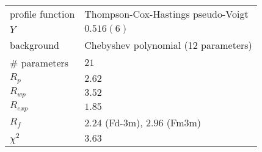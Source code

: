\documentclass[\main/dresen_thesis.tex]{subfiles}
\begin{document}
\begin{table}[ht]
\begin{tabular}{ l | l | l | l | l }
      \hline
      \multicolumn{2}{l}{profile function} & \multicolumn{3}{l}{Thompson-Cox-Hastings pseudo-Voigt}\\
      \multicolumn{2}{l}{$Y$} & \multicolumn{3}{l}{$0.516(6)$}\\
      \hline
      \multicolumn{2}{l}{background} & \multicolumn{3}{l}{Chebyshev polynomial (12 parameters)} \\
      \hline
      \multicolumn{2}{l}{\# parameters} & \multicolumn{3}{l}{$21$}\\
      \multicolumn{2}{l}{$R_p$} & \multicolumn{3}{l}{$2.62$}\\
      \multicolumn{2}{l}{$R_{wp}$} & \multicolumn{3}{l}{$3.52$}\\
      \multicolumn{2}{l}{$R_{exp}$} & \multicolumn{3}{l}{$1.85$}\\
      \multicolumn{2}{l}{$R_{f}$} & \multicolumn{3}{l}{$2.24$ (Fd-3m), $2.96$ (Fm3m)}\\
      \multicolumn{2}{l}{$\chi^2$} & \multicolumn{3}{l}{$3.63$}\\
      \hline
    \end{tabular}
  \end{table}
\end{document}
